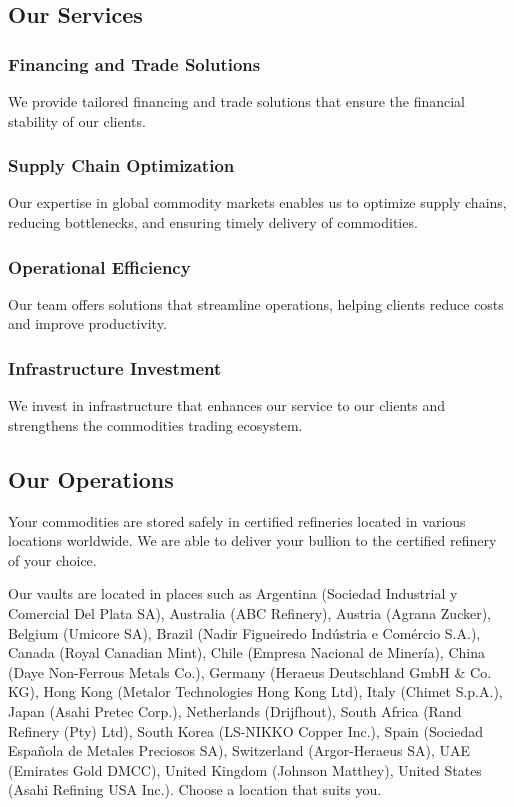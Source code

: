 \documentclass[11pt]{article}
\begin{document}
\subsection{Our Services}

\subsubsection{Financing and Trade Solutions}

We provide tailored financing and trade solutions that ensure the financial stability of our clients.


\subsubsection{Supply Chain Optimization}

Our expertise in global commodity markets enables us to optimize supply chains, reducing bottlenecks, and ensuring timely delivery of commodities.


\subsubsection{Operational Efficiency}

Our team offers solutions that streamline operations, helping clients reduce costs and improve productivity.


\subsubsection{Infrastructure Investment}

We invest in infrastructure that enhances our service to our clients and strengthens the commodities trading ecosystem.


\subsection{Our Operations}

Your commodities are stored safely in certified refineries located in various locations worldwide. We are able to deliver your bullion to the certified refinery of your choice.


Our vaults are located in places such as Argentina (Sociedad Industrial y Comercial Del Plata SA), Australia (ABC Refinery), Austria (Agrana Zucker), Belgium (Umicore SA), Brazil (Nadir Figueiredo Indústria e Comércio S.A.), Canada (Royal Canadian Mint), Chile (Empresa Nacional de Minería), China (Daye Non-Ferrous Metals Co.), Germany (Heraeus Deutschland GmbH \& Co. KG), Hong Kong (Metalor Technologies Hong Kong Ltd), Italy (Chimet S.p.A.), Japan (Asahi Pretec Corp.), Netherlands (Drijfhout), South Africa (Rand Refinery (Pty) Ltd), South Korea (LS-NIKKO Copper Inc.), Spain (Sociedad Española de Metales Preciosos SA), Switzerland (Argor-Heraeus SA), UAE (Emirates Gold DMCC), United Kingdom (Johnson Matthey), United States (Asahi Refining USA Inc.). Choose a location that suits you.
\end{document}
